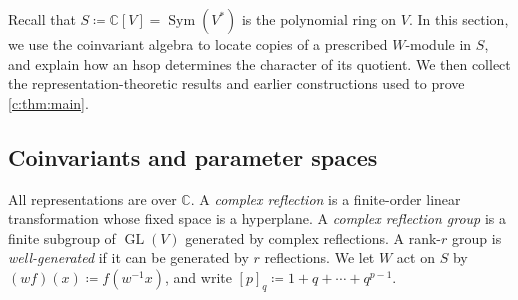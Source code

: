 \documentclass[11pt]{amsart}
\newcommand{\defeq}{\coloneqq}
\newcommand{\defn}[1]{\emph{\color{darkblue}#1}}
\theoremstyle{definition}
\newcommand{\C}{\mathbb C}\newcommand{\Q}{\mathbb Q}
\DeclareMathOperator{\Sym}{Sym}\DeclareMathOperator{\Hom}{Hom}
\begin{document}
Recall that $S\defeq\C[V]=\Sym(V^*)$ is the polynomial ring on $V$.
In this section, we use the coinvariant algebra to locate copies of a
prescribed $W$-module in $S$, and explain how an hsop determines the
character of its quotient. We then collect the representation-theoretic
results and earlier constructions used to prove \cref{c:thm:main}.

\subsection{Coinvariants and parameter spaces}\label{b:sec:coinvariants}


All representations are over $\C$. A \defn{complex reflection} is a
finite-order linear transformation whose fixed space is a hyperplane. A
\defn{complex reflection group} is a finite subgroup of
$\operatorname{GL}(V)$ generated by complex reflections. A rank-$r$
group is \defn{well-generated} if it can be generated by $r$ reflections.
We let $W$ act on $S$ by
$(wf)(x)\defeq f(w^{-1}x)$, and write
$[p]_q\defeq1+q+\cdots+q^{p-1}$.
\end{document}
